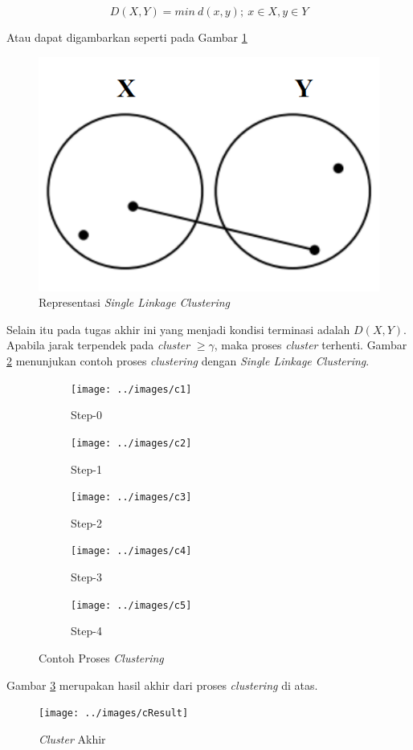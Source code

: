 \documentclass[../Proposal.tex]{subfiles}
\begin{document}
\begin{center}
	\begin{equation}
		D(X,Y)=min\ d(x,y) ;\ x \in X, y \in Y
		\label{eq:dmin}
	\end{equation}
\end{center}
Atau dapat digambarkan seperti pada Gambar \ref{fig:dist}
\begin{center}
	\begin{figure}[H]
		\includegraphics[width=.4\linewidth]{../images/repSingle}
		\caption{Representasi \textit{Single Linkage Clustering}}
		\label{fig:dist}
	\end{figure}
\end{center}

\noindent Selain itu pada tugas akhir ini yang menjadi kondisi terminasi adalah $D(X,Y)$. Apabila jarak terpendek pada \textit{cluster} $\geq \gamma$, maka proses \textit{cluster} terhenti. Gambar \ref{fig:scl} menunjukan contoh proses \textit{clustering} dengan \textit{Single Linkage Clustering}.

\begin{figure}[H]
	\centering
	
	
	\begin{subfigure}{.5\textwidth}
		\centering
		\texttt{[image: ../images/c1]}
		\caption{Step-0}
	\end{subfigure}%
	\begin{subfigure}{.5\textwidth}
		\centering
		\texttt{[image: ../images/c2]}
		\caption{Step-1}
	\end{subfigure}
	
	\centering
	\begin{subfigure}{.5\textwidth}
		\centering
		\texttt{[image: ../images/c3]}
		\caption{Step-2}
	\end{subfigure}%
	\begin{subfigure}{.5\textwidth}
		\centering
		\texttt{[image: ../images/c4]}
		\caption{Step-3}
	\end{subfigure}

	\centering
	\begin{subfigure}{.5\textwidth}
		\centering
		\texttt{[image: ../images/c5]}
		\caption{Step-4}
	\end{subfigure}
\caption{Contoh Proses \textit{Clustering}}
\label{fig:scl}

\end{figure}

\noindent Gambar \ref{fig:endcl} merupakan hasil akhir dari proses \textit{clustering} di atas.

	\begin{figure}[H]
		\texttt{[image: ../images/cResult]}
		\caption{\textit{Cluster} Akhir}
		\label{fig:endcl}
	\end{figure}
\end{document}
